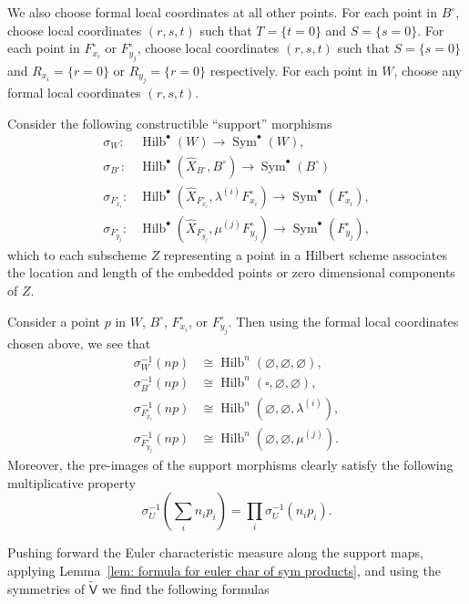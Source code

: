 \documentclass[12pt]{amsart}
\theoremstyle{definition}
\newcommand{\sfVtilde}{\widetilde{\mathsf{V}}}
\newcommand{\Sym}{\operatorname{Sym}}
\newcommand{\Hilb}{\operatorname{Hilb}}
\renewcommand{\emptyset}{\varnothing}
\newcommand{\Xhat}{\widehat{X}}
\newcommand{\bx}{\square}
\begin{document}
We also choose formal local coordinates at all other points. For each
point in $B^{\circ}$, choose local coordinates $(r,s,t)$ such that
$T=\{t=0 \}$ and $S=\{s=0 \}$. For each point in $F^{\circ}_{x_{i}}$
or $F^{\circ}_{y_{j}}$, choose local coordinates $(r,s,t)$ such that
$S=\{s=0 \}$ and $R_{x_{i}}=\{r=0 \}$ or $R_{y_{j}}=\{r=0 \}$
respectively. For each point in $W$, choose any formal local
coordinates $(r,s,t)$.

Consider the following constructible ``support'' morphisms
\begin{align*}
\sigma_{W}:& \Hilb^{\bullet}(W) \to \Sym^{\bullet}(W),\\
\sigma_{B^{\circ }}:& \Hilb^{\bullet}(\Xhat_{B^{\circ}},B^{\circ}) \to \Sym^{\bullet}(B^{\circ })\\
\sigma_{F_{x_{i}}^{\circ }}:& \Hilb^{\bullet}(\Xhat_{F_{x_{i}}^{\circ}},\lambda^{(i)}F_{x_{i}}^{\circ}) \to \Sym^{\bullet}(F_{x_{i}}^{\circ }),\\
\sigma_{F_{y_{j}}^{\circ }}:& \Hilb^{\bullet}(\Xhat_{F_{y_{j}}^{\circ}},\mu^{(j)}F_{y_{j}}^{\circ}) \to \Sym^{\bullet}(F_{y_{j}}^{\circ }),
\end{align*}
which to each subscheme $Z$ representing a point in a Hilbert scheme
associates the location and length of the embedded points or zero
dimensional components of $Z$. 

Consider a point $p$ in $W$, $B^{\circ}$, $F_{x_{i}}^{\circ }$, or
$F_{y_{j}}^{\circ}$. Then using the formal local coordinates chosen
above, we see that 
\begin{align*}
\sigma_{W}^{-1}(np) &\cong \Hilb^{n}\left(\emptyset ,\emptyset,\emptyset \right), \\
\sigma_{B^{\circ }}^{-1}(np) &\cong \Hilb^{n}\left(\bx ,\emptyset ,\emptyset \right), \\
\sigma_{F_{x_{i}}^{\circ }}^{-1}(np) &\cong \Hilb^{n}\left(\emptyset  ,\emptyset,\lambda^{(i)}  \right), \\
\sigma_{F_{y_{j}}^{\circ }}^{-1}(np) &\cong \Hilb^{n}\left(\emptyset
,\emptyset,\mu^{(j)} \right).
\end{align*}
Moreover, the pre-images of the support morphisms clearly satisfy the
following multiplicative property
\[
\sigma^{-1}_{U}\left(\sum_{i}n_{i}p_{i} \right) = \prod_{i}
\sigma^{-1}_{U}\left(n_{i}p_{i} \right).
\]


Pushing forward the Euler characteristic measure along the support
maps, applying Lemma~\ref{lem: formula for euler char of sym
products}, and using the symmetries of $\sfVtilde$ we find the
following formulas
\end{document}
